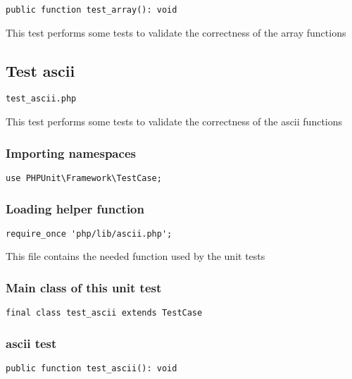 \documentclass[a4paper]{article}
\begin{document}
\begin{lstlisting}
public function test_array(): void
\end{lstlisting}

This test performs some tests to validate the correctness
of the array functions

\hypertarget{toc41}{}
\subsection{Test ascii}

\begin{lstlisting}
test_ascii.php
\end{lstlisting}

This test performs some tests to validate the correctness
of the ascii functions

\hypertarget{toc42}{}
\subsubsection{Importing namespaces}

\begin{lstlisting}
use PHPUnit\Framework\TestCase;
\end{lstlisting}

\hypertarget{toc43}{}
\subsubsection{Loading helper function}

\begin{lstlisting}
require_once 'php/lib/ascii.php';
\end{lstlisting}

This file contains the needed function used by the unit tests

\hypertarget{toc44}{}
\subsubsection{Main class of this unit test}

\begin{lstlisting}
final class test_ascii extends TestCase
\end{lstlisting}

\hypertarget{toc45}{}
\subsubsection{ascii test}

\begin{lstlisting}
public function test_ascii(): void
\end{lstlisting}
\end{document}
